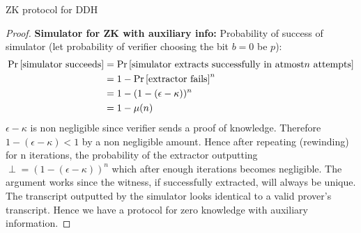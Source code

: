 \begin{solution}{ZK protocol for DDH}
\begin{proof}
    \textbf{Simulator for ZK with auxiliary info:}
    Probability of success of simulator (let probability of verifier choosing the bit $b = 0$ be $p$):
    \begin{equation}
        \begin{split}
            \Pr\left[ \text{simulator succeeds} \right] &= \Pr\left[ \text{simulator extracts successfully in atmost}n\text{ attempts} \right]\\
            &= 1 - \Pr\left[ \text{extractor fails} \right]^n\\
            &= 1 - (1 - (\epsilon - \kappa))^n   \\
            & = 1 - \mu(n)
        \end{split}
    \end{equation}
    $\epsilon - \kappa$ is non negligible since verifier sends a proof of knowledge. Therefore $1-(\epsilon - \kappa)<1$ by a non negligible amount. Hence after repeating (rewinding) for n iterations, the probability of the extractor outputting $\perp = (1-(\epsilon - \kappa))^n$ which after enough iterations becomes negligible. The argument works since the witness, if successfully extracted, will always be unique.\\
    
    The transcript outputted by the simulator looks identical to a valid prover's transcript. Hence we have a protocol for zero knowledge with auxiliary information.
    \end{proof}
\end{solution}
